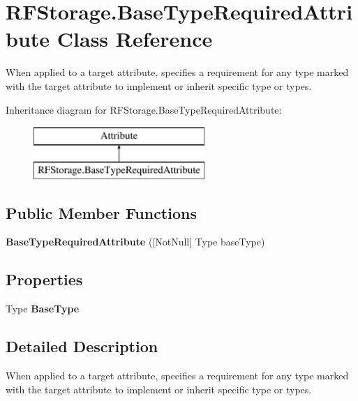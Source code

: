 \section{R\+F\+Storage.\+Base\+Type\+Required\+Attribute Class Reference}
\label{class_r_f_storage_1_1_base_type_required_attribute}


When applied to a target attribute, specifies a requirement for any type marked with the target attribute to implement or inherit specific type or types.  


Inheritance diagram for R\+F\+Storage.\+Base\+Type\+Required\+Attribute\+:\begin{figure}[H]
\begin{center}
\leavevmode
\includegraphics[height=2.000000cm]{class_r_f_storage_1_1_base_type_required_attribute}
\end{center}
\end{figure}
\subsection*{Public Member Functions}
\begin{DoxyCompactItemize}
\item 
\mbox{\label{class_r_f_storage_1_1_base_type_required_attribute_a6a120f605834d99741a274e39f1d8df8}} 
{\bfseries Base\+Type\+Required\+Attribute} ([Not\+Null] Type base\+Type)
\end{DoxyCompactItemize}
\subsection*{Properties}
\begin{DoxyCompactItemize}
\item 
\mbox{\label{class_r_f_storage_1_1_base_type_required_attribute_a24f55f70d785f960dabef947a11a84f2}} 
Type {\bfseries Base\+Type}\hspace{0.3cm}{\ttfamily  [get]}
\end{DoxyCompactItemize}


\subsection{Detailed Description}
When applied to a target attribute, specifies a requirement for any type marked with the target attribute to implement or inherit specific type or types. 


